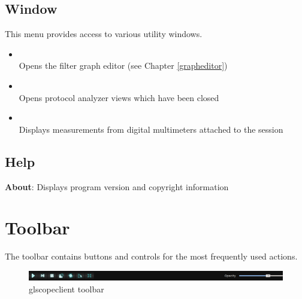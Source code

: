 \subsection{Window}

This menu provides access to various utility windows.

\begin{itemize}

\item {}\\
Opens the filter graph editor (see Chapter \ref{grapheditor})

\item {}\\
Opens protocol analyzer views which have been closed

\item {}\\
Displays measurements from digital multimeters attached to the session

\end{itemize}


\subsection{Help}

\textbf{About}: Displays program version and copyright information

\section{Toolbar}

The toolbar contains buttons and controls for the most frequently used actions.

\begin{figure}[h]
\centering
\includegraphics[width=16cm]{images/toolbar.png}
\caption{glscopeclient toolbar}
\label{toolbar}
\end{figure}

